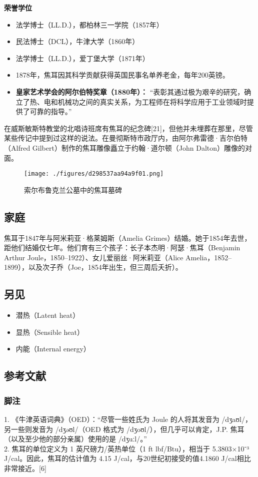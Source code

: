 \textbf{荣誉学位} 
\begin{itemize}
\item 法学博士（LL.D.），都柏林三一学院（1857年）  
\item 民法博士（DCL），牛津大学（1860年）  
\item 法学博士（LL.D.），爱丁堡大学（1871年）  
\end{itemize}

\begin{itemize}
\item 1878年，焦耳因其科学贡献获得英国民事名单养老金，每年200英镑。  
\item \textbf{皇家艺术学会的阿尔伯特奖章（1880年）：} 
“表彰其通过极为艰辛的研究，确立了热、电和机械功之间的真实关系，为工程师在将科学应用于工业领域时提供了可靠的指导。” 
\end{itemize} 

在威斯敏斯特教堂的北唱诗班席有焦耳的纪念碑[21]，但他并未埋葬在那里，尽管某些传记中提到过这样的说法。在曼彻斯特市政厅内，由阿尔弗雷德·吉尔伯特（Alfred Gilbert）制作的焦耳雕像矗立于约翰·道尔顿（John Dalton）雕像的对面。
\begin{figure}[ht]
\centering
\texttt{[image: ./figures/d298537aa94a9f01.png]}
\caption{索尔布鲁克兰公墓中的焦耳墓碑} \label{fig_JR_9}
\end{figure}
\subsection{家庭}
焦耳于1847年与阿米莉亚·格莱姆斯（Amelia Grimes）结婚。她于1854年去世，距他们结婚仅七年。他们育有三个孩子：长子本杰明·阿瑟·焦耳（Benjamin Arthur Joule，1850–1922）、女儿爱丽丝·阿米莉亚（Alice Amelia，1852–1899），以及次子乔（Joe，1854年出生，但三周后夭折）。
\subsection{另见}  
\begin{itemize}
\item 潜热（Latent heat）  
\item 显热（Sensible heat）  
\item 内能（Internal energy）
\end{itemize}  
\subsection{参考文献}  
\subsubsection{脚注} 
1. 《牛津英语词典》（OED）：“尽管一些姓氏为 Joule 的人将其发音为 /dʒaʊl/，另一些则发音为 /dʒəʊl/（OED 格式为 /dʒoʊl/），但几乎可以肯定，J.P. 焦耳（以及至少他的部分亲属）使用的是 /dʒuːl/。”\\  
2. 焦耳的单位定义为 1 英尺磅力/英热单位（1 ft lbf/Btu），相当于 5.3803×10⁻³ J/cal。因此，焦耳的估计值为 4.15 J/cal，与20世纪初接受的值4.1860 J/cal相比非常接近。[6]  
